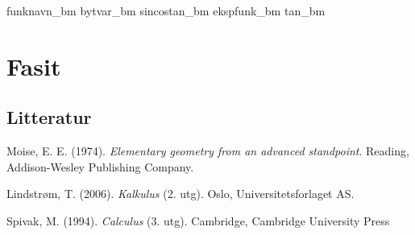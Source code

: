 	{funknavn_bm}
	{bytvar_bm}
	{sincostan_bm}	
	{ekspfunk_bm}
	{tan_bm}
	
	{\printindex {}
		}
	
	\chapter*{Fasit}
	
	


	

	
	\newpage
	\section*{Litteratur}
	Moise, E. E. (1974). \textit{Elementary geometry from an advanced standpoint}. Reading, Addison-Wesley Publishing Company.\vsk
	
	Lindstrøm, T. (2006). \textit{Kalkulus} (2. utg). Oslo, Universitetsforlaget AS.\vsk
	
	Spivak, M. (1994). \textit{Calculus} (3. utg). Cambridge, Cambridge University Press
	
	


